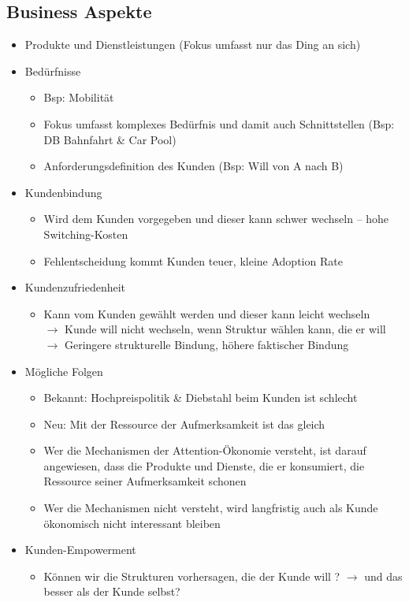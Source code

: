 \documentclass{article} %
\begin{document}
	\subsection{Business Aspekte}
	\begin{itemize}
		\item Produkte und Dienstleistungen (Fokus umfasst nur das \glqq Ding an sich\grqq)
		\item Bedürfnisse
		\begin{itemize}
			\item Bsp: Mobilität
			\item Fokus umfasst komplexes Bedürfnis und damit auch Schnittstellen (Bsp: DB Bahnfahrt \& Car Pool)
			\item Anforderungsdefinition des Kunden (Bsp: Will von A nach B)
		\end{itemize}
		\item Kundenbindung
		\begin{itemize}
			\item Wird dem Kunden vorgegeben und dieser kann schwer wechseln – hohe Switching-Kosten
			\item Fehlentscheidung kommt Kunden teuer, kleine Adoption Rate
		\end{itemize}
		\item Kundenzufriedenheit
		\begin{itemize}
			\item Kann vom Kunden gewählt werden und dieser kann leicht wechseln\\
		$\rightarrow$ Kunde will nicht wechseln, wenn Struktur wählen			 kann, die er will\\
		$\rightarrow$ Geringere strukturelle Bindung, höhere faktischer Bindung
		\end{itemize}
		\item Mögliche Folgen
		\begin{itemize}
			\item Bekannt: Hochpreispolitik \& Diebstahl beim Kunden ist schlecht
			\item Neu: Mit der Ressource der Aufmerksamkeit ist das gleich
			\item Wer die Mechanismen der Attention-Ökonomie versteht, ist darauf angewiesen, dass die Produkte und Dienste, die er konsumiert, die Ressource seiner Aufmerksamkeit schonen
			\item Wer die Mechanismen nicht versteht, wird langfristig auch als Kunde ökonomisch nicht interessant bleiben
		\end{itemize}
		\item Kunden-Empowerment
		\begin{itemize}
			\item Können wir die Strukturen vorhersagen, die der Kunde will ? $\rightarrow$ und das besser als der Kunde selbst?
			
		\end{itemize}
	\end{itemize}
	
\end{document}
